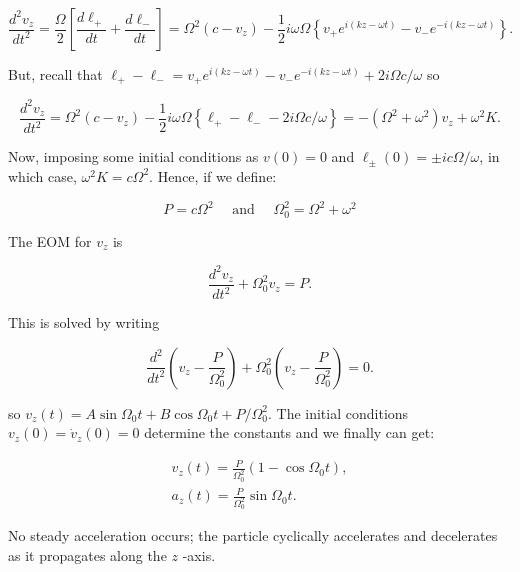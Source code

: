 \begin{equation}
	\frac{d^{2} v_{z}}{d t^{2}}=\frac{\Omega}{2}\left[\frac{d \ell_{+}}{d t}+\frac{d \ell_{-}}{d t}\right]=\Omega^{2}\left(c-v_{z}\right)-\frac{1}{2} i \omega \Omega\left\{v_{+} e^{i(k z-\omega t)}-v_{-} e^{-i(k z-\omega t)}\right\} .
\end{equation}

But, recall that $\ell_{+}-\ell_{-}=v_{+} e^{i(k z-\omega t)}-v_{-} e^{-i(k z-\omega t)}+2 i \Omega c / \omega$ so
	
\begin{equation}
	\frac{d^{2} v_{z}}{d t^{2}}=\Omega^{2}\left(c-v_{z}\right)-\frac{1}{2} i \omega \Omega\left\{\ell_{+}-\ell_{-}-2 i \Omega c / \omega\right\}=-\left(\Omega^{2}+\omega^{2}\right) v_{z}+\omega^{2} K.
\end{equation}

Now, imposing some initial conditions as $v(0)=0$ and $\ell_{\pm}(0)=\pm i c \Omega / \omega$, in which case, $\omega^{2} K=c \Omega^{2} .$ Hence, if we define:
	
\begin{equation}
	P=c \Omega^{2} \quad \text { and } \quad \Omega_{0}^{2}=\Omega^{2}+\omega^{2}
\end{equation}

The EOM for $v_{z}$ is
	
\begin{equation}
	\frac{d^{2} v_{z}}{d t^{2}}+\Omega_{0}^{2} v_{z}=P.
\end{equation}

This is solved by writing
	
\begin{equation}
	\frac{d^{2}}{dt^{2}}\left(v_{z}-\frac{P}{\Omega_{0}^{2}}\right)+\Omega_{0}^{2}\left(v_{z}-\frac{P}{\Omega_{0}^{2}}\right)=0.
\end{equation}

so $v_{z}(t)=A \sin \Omega_{0} t+B \cos \Omega_{0} t+P / \Omega_{0}^{2} .$ The initial conditions $v_{z}(0)=\dot{v}_{z}(0)=0$ determine the constants and we finally can get:
	
\begin{equation}
	\begin{split}
		v_{z}(t)=\frac{P}{\Omega_{0}^{2}}\left(1-\cos \Omega_{0} t\right), \\
		a_{z}(t)=\frac{P}{\Omega_{0}^{2}} \sin \Omega_{0} t.
	\end{split}
\end{equation}

No steady acceleration occurs; the particle cyclically accelerates and decelerates as it propagates along the $z$ -axis.

